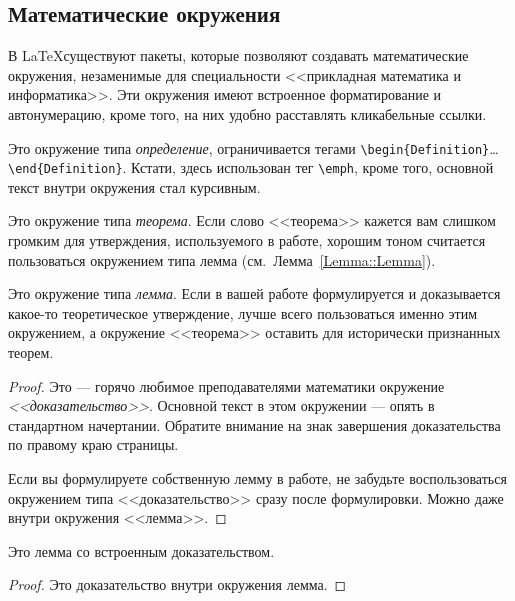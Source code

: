 \documentclass[14pt, russian]{scrartcl}
\begin{document}
\subsection{Математические окружения}\label{Sect::MathEnv}

В \LaTeX существуют пакеты, которые позволяют создавать математические окружения, незаменимые для специальности <<прикладная математика и информатика>>. Эти окружения имеют встроенное форматирование и автонумерацию, кроме того, на них удобно расставлять кликабельные ссылки.

\begin{Definition}
Это окружение типа \emph{определение}, ограничивается тегами \texttt{\textbackslash begin\{Definition\}}\dots \texttt{\textbackslash end\{Definition\}}. Кстати, здесь использован тег \texttt{\textbackslash emph}, кроме того, основной текст внутри окружения стал курсивным.
\end{Definition} 

\begin{Theorem}
Это окружение типа \emph{теорема}. Если слово <<теорема>> кажется вам слишком громким для утверждения, используемого в работе, хорошим тоном считается пользоваться окружением типа лемма (см.~Лемма~\ref{Lemma::Lemma}).
\end{Theorem} 

\begin{Lemma}\label{Lemma::Lemma}
Это окружение типа \emph{лемма}. Если в вашей работе формулируется и доказывается какое-то теоретическое утверждение, лучше всего пользоваться именно этим окружением, а окружение <<теорема>> оставить для исторически признанных теорем.
\end{Lemma} 

\begin{proof}
Это --- горячо любимое преподавателями математики окружение \emph{<<доказательство>>}. Основной текст в этом окружении --- опять в стандартном начертании. Обратите внимание на знак завершения доказательства по правому краю страницы.

Если вы формулируете собственную лемму в работе, не забудьте воспользоваться окружением типа <<доказательство>> сразу после формулировки. Можно даже внутри окружения <<лемма>>.
\end{proof}

\begin{Lemma}
Это лемма со встроенным доказательством.
\begin{proof}
Это доказательство внутри окружения лемма.
\end{proof}
\end{Lemma} 
\end{document}
